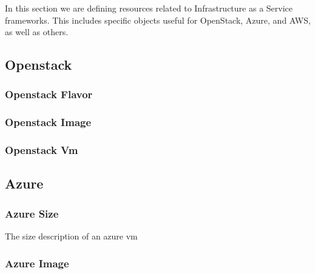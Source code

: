 \documentclass[9pt,twocolumn]{styles/osajnl}
\begin{document}
In this section we are defining resources related to Infrastructure as
a Service frameworks. This includes specific objects useful for
OpenStack, Azure, and AWS, as well as others.

\subsection{Openstack}

\subsubsection{Openstack Flavor}


\subsubsection{Openstack Image}


\subsubsection{Openstack Vm}


\subsection{Azure}

\subsubsection{Azure Size}

The size description of an azure vm



\subsubsection{Azure Image}
\end{document}
